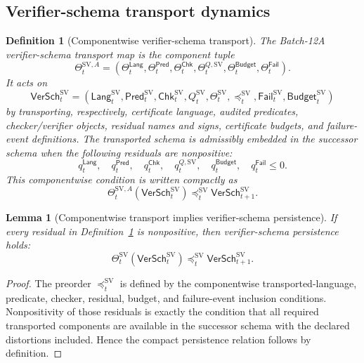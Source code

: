 \documentclass[11pt]{article}
\newtheorem{lemma}[theorem]{Lemma}
\newtheorem{definition}[theorem]{Definition}
\newcommand{\1}{\mathbf{1}}
\begin{document}
\subsection{Verifier-schema transport dynamics}

\begin{definition}[Componentwise verifier-schema transport]
\label{def:batch12a_verifier_schema_transport_dynamics}
The Batch-12A verifier-schema transport map is the component tuple
\[
\Theta_t^{\mathrm{SV},A}
=
(\Theta_t^{\mathsf{Lang}},
 \Theta_t^{\mathsf{Pred}},
 \Theta_t^{\mathsf{Chk}},
 \Theta_t^{Q,\mathrm{SV}},
 \Theta_t^{\mathsf{Budget}},
 \Theta_t^{\mathsf{Fail}}).
\]
It acts on
\[
\mathsf{VerSch}_t^{\mathrm{SV}}
=(\mathsf{Lang}_t^{\mathrm{SV}},\mathsf{Pred}_t^{\mathrm{SV}},\mathsf{Chk}_t^{\mathrm{SV}},Q_t^{\mathrm{SV}},\Theta_t^{\mathrm{SV}},\preceq_t^{\mathrm{SV}},\mathsf{Fail}_t^{\mathrm{SV}},\mathsf{Budget}_t^{\mathrm{SV}})
\]
by transporting, respectively, certificate language, audited predicates, checker/verifier objects, residual names and signs, certificate budgets, and failure-event definitions.  The transported schema is admissibly embedded in the successor schema when the following residuals are nonpositive:
\[
q_t^{\mathsf{Lang}},\quad
q_t^{\mathsf{Pred}},\quad
q_t^{\mathsf{Chk}},\quad
q_t^{Q,\mathrm{SV}},\quad
q_t^{\mathsf{Budget}},\quad
q_t^{\mathsf{Fail}}\le0.
\]
This componentwise condition is written compactly as
\[
\Theta_t^{\mathrm{SV},A}(\mathsf{VerSch}_t^{\mathrm{SV}})
\preceq_t^{\mathrm{SV}}
\mathsf{VerSch}_{t+1}^{\mathrm{SV}}.
\]
\end{definition}

\begin{lemma}[Componentwise transport implies verifier-schema persistence]
\label{lem:batch12a_componentwise_transport_implies_persistence}
If every residual in Definition~\ref{def:batch12a_verifier_schema_transport_dynamics} is nonpositive, then verifier-schema persistence holds:
\[
\Theta_t^{\mathrm{SV}}(\mathsf{VerSch}_t^{\mathrm{SV}})
\preceq_t^{\mathrm{SV}}
\mathsf{VerSch}_{t+1}^{\mathrm{SV}}.
\]
\end{lemma}

\begin{proof}
The preorder \(\preceq_t^{\mathrm{SV}}\) is defined by the componentwise transported-language, predicate, checker, residual, budget, and failure-event inclusion conditions.  Nonpositivity of those residuals is exactly the condition that all required transported components are available in the successor schema with the declared distortions included.  Hence the compact persistence relation follows by definition.
\end{proof}
\end{document}
